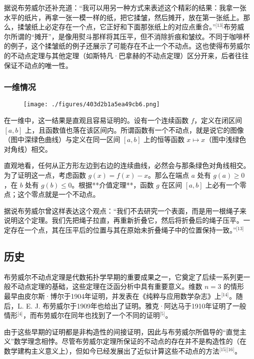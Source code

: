 据说布劳威尔还补充道：“我可以用另一种方式来表述这个精彩的结果：我拿一张水平的纸片，再拿一张一模一样的纸，把它揉皱，然后摊开，放在第一张纸上。那么，揉皱纸上必定存在一个点，它正好和下面那张纸上的对应点重合。”\(^\text{[13]}\)布劳威尔所谓的“摊开”，是像用熨斗那样将其压平，但不消除折痕和皱纹。不同于咖啡杯的例子，这个揉皱纸的例子还展示了可能存在不止一个不动点。这也使得布劳威尔的不动点定理与其他定理（如斯特凡·巴拿赫的不动点定理）区分开来，后者往往保证不动点的唯一性。
\subsubsection{一维情况}
\begin{figure}[ht]
\centering
\texttt{[image: ./figures/403d2b1a5ea49cb6.png]}
\caption{} \label{fig_BLWRbd_1}
\end{figure}
在一维中，这一结果是直观且容易证明的。设有一个连续函数 $f$，定义在闭区间 $[a, b]$ 上，且函数值也落在该区间内。所谓函数有一个不动点，就是说它的图像（图中深绿色曲线）与定义在同一区间 $[a, b]$ 上的恒等函数 $x \mapsto x$（图中浅绿色对角线）相交。

直观地看，任何从正方形左边到右边的连续曲线，必然会与那条绿色对角线相交。为了证明这一点，考虑函数 $g(x) = f(x) - x$。那么在端点 $a$ 处有 $g(a) \ge 0$，在 $b$ 处有 $g(b) \le 0$。根据**介值定理**，函数 $g$ 在区间 $[a, b]$ 上必有一个零点；这个零点就是一个不动点。

据说布劳威尔曾这样表达这个观点：“我们不去研究一个表面，而是用一根绳子来说明这个定理。我们先把绳子拉直，再重新折叠它，然后将折叠后的绳子压平。一定存在一个点，其在压平后的位置与其在原始未折叠绳子中的位置保持一致。”\(^\text{[13]}\)
\subsection{历史}
布劳威尔不动点定理是代数拓扑学早期的重要成果之一，它奠定了后续一系列更一般不动点定理的基础，这些定理在泛函分析中具有重要意义。维数 $n = 3$ 的情形最早由皮尔斯·博尔于1904年证明，并发表在《纯粹与应用数学杂志》上\(^\text{[14]}\)。随后，L. E. J. 布劳威尔于1909年也给出了证明。雅克·阿达马于1910年证明了一般情形\(^\text{[4]}\)，而布劳威尔在同年也找到了一个不同的证明\(^\text{[5]}\)。

由于这些早期的证明都是非构造性的间接证明，因此与布劳威尔所倡导的“直觉主义”数学理念相悖。尽管布劳威尔定理所保证的不动点的存在并不是构造性的（在数学建构主义意义上），但如今已经发展出了近似计算这些不动点的方法\(^\text{[15][16]}\)。

